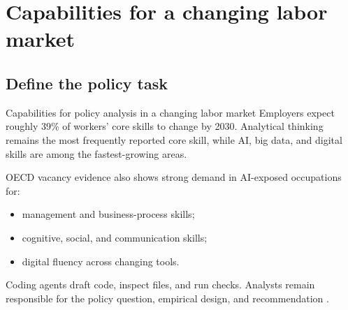 \section{Capabilities for a changing labor market}
\subsection{Define the policy task}

\begin{frame}{Capabilities for policy analysis in a changing labor market}
  Employers expect roughly \alert{39\% of workers' core skills} to change by
  2030. Analytical thinking remains the most frequently reported core skill,
  while AI, big data, and digital skills are among the fastest-growing areas.

  \vspace{0.6em}
  OECD vacancy evidence also shows strong demand in AI-exposed occupations for:
  \begin{itemize}
    \item management and business-process skills;
    \item cognitive, social, and communication skills;
    \item digital fluency across changing tools.
  \end{itemize}

  \vfill
  Coding agents draft code, inspect files, and run checks. Analysts remain
  responsible for the policy question, empirical design, and recommendation
  \citep{wef2025futurejobs,green2024skills,oecd2026skills}.
\end{frame}


